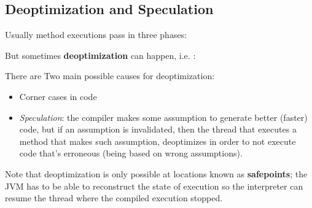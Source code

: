 \subsection{Deoptimization and Speculation}
Usually method executions pass in three phases:
\nl


But sometimes \textbf{deoptimization} can happen, i.e. :
\nl


{There are Two main possible causes for deoptimization:\ns
\begin{itemize}
	\item Corner cases in code
	\item \textit{Speculation}: the compiler makes some assumption to generate better (faster) code, but if an assumption is invalidated, then the thread that executes a method that
    makes such assumption, \textit{}deoptimizes in order to not execute code that's
    erroneous (being based on wrong assumptions).
\end{itemize}}

Note that deoptimization is only possible at
locations known as \textbf{safepoints}; 
the JVM has to be able to reconstruct the state of execution so the interpreter can resume the thread where the compiled execution stopped.